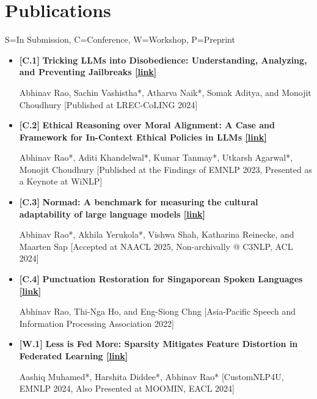 \documentclass[11pt,letterpaper]{article}
\begin{document}
\section*{Publications}
\small{S=In Submission, C=Conference, W=Workshop, P=Preprint}

\begin{itemize}[leftmargin=*,label={},itemsep=4pt]
    \item {\color{maincolor}\textbf{[C.1]}} \textbf{Tricking LLMs into Disobedience: Understanding, Analyzing, and Preventing Jailbreaks \href{https://aclanthology.org/2024.lrec-main.458/}{[link]}}  
          
        Abhinav Rao, Sachin Vashistha*, Atharva Naik*, Somak Aditya, and Monojit Choudhury
        [Published at LREC-CoLING 2024]
    
       
    \item {\color{maincolor}\textbf{[C.2]}} \textbf{Ethical Reasoning over Moral Alignment: A Case and Framework for In-Context Ethical Policies in LLMs \href{https://aclanthology.org/2023.findings-emnlp.1097/}{[link]}}  
          
        Abhinav Rao*, Aditi Khandelwal*, Kumar Tanmay*, Utkarsh Agarwal*, Monojit Choudhury
        [Published at the Findings of EMNLP 2023, Presented as a Keynote at WiNLP]
    
       
    \item {\color{maincolor}\textbf{[C.3]}} \textbf{Normad: A benchmark for measuring the cultural adaptability of large language models \href{https://c3nlp.github.io/}{[link]}}  
          
        Abhinav Rao*, Akhila Yerukola*, Vishwa Shah, Katharina Reinecke, and Maarten Sap
        [Accepted at NAACL 2025, Non-archivally @ C3NLP, ACL 2024]
    
       
    \item {\color{maincolor}\textbf{[C.4]}} \textbf{Punctuation Restoration for Singaporean Spoken Languages \href{https://www.apsipa.org/proceedings/2022/}{[link]}}  
          
        Abhinav Rao, Thi-Nga Ho, and Eng-Siong Chng
        [Asia-Pacific Speech and Information Processing Association 2022]
    
       
    \item {\color{maincolor}\textbf{[W.1]}} \textbf{Less is Fed More: Sparsity Mitigates Feature Distortion in Federated Learning \href{https://moomin.eacl.org/}{[link]}}  
          
        Aashiq Muhamed*, Harshita Diddee*, Abhinav Rao*
        [CustomNLP4U, EMNLP 2024, Also Presented at MOOMIN, EACL 2024]
    

\end{itemize}
\end{document}
